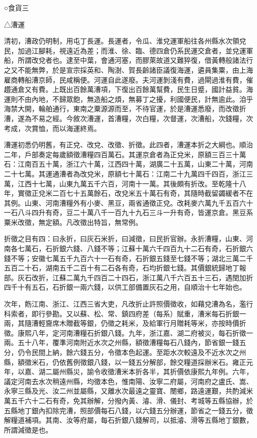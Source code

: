 
\begin{pinyinscope}
○食貨三

△漕運

清初，漕政仍明制，用屯丁長運。長運者，令瓜、淮兌運軍船往各州縣水次領兌民，加過江腳耗，視遠近為差；而淮、徐、臨、德四倉仍系民運交倉者，並兌運軍船，所謂改兌者也。逮至中葉，會通河塞，而膠萊故道又難猝復，借黃轉般諸法行之又不能無弊，於是宣宗採英和、陶澍、賀長齡諸臣議復海運，遴員集粟，由上海雇商轉船漕京師，民咸稱便。河運自此遂廢。夫河運剝淺有費，過閘過淮有費，催趲通倉又有費。上既出百餘萬漕項，下復出百餘萬幫費，民生日蹙，國計益貧。海運則不由內地，不歸眾飽，無造船之煩，無募丁之擾，利國便民，計無逾此。洎乎海禁大開，輪舶通行，東南之粟源源而至，不待官運，於是漕運悉廢，而改徵折漕，遂為不易之經。今敘次漕運，首漕糧，次白糧，次督運，次漕船，次錢糧，次考成，次賞恤，而以海運終焉。

漕運初悉仍明舊，有正兌、改兌、改徵、折徵。此四者，漕運本折之大綱也。順治二年，戶部奏定每歲額徵漕糧四百萬石。其運京倉者為正兌米，原額三百三十萬石：江南百五十萬，浙江六十萬，江西四十萬，湖廣二十五萬，山東二十萬，河南二十七萬。其運通漕者為改兌米，原額七十萬石：江南二十九萬四千四百，浙江三萬，江西十七萬，山東九萬五千六百，河南十一萬。其後頗有折改。至乾隆十八年，實徵正兌米二百七十五萬餘石，改兌米五十萬石有奇，其隨時截留蠲緩者不在其例。山東、河南漕糧外有小麥、黑豆，兩省通徵正兌。改耗麥六萬九千五百六十一石八斗四升有奇，豆二十萬八千一百九十九石三斗一升有奇，皆運京倉。黑豆系粟米改徵，無定額。凡改徵出特旨，無常例。

折徵之目有四：曰永折，曰灰石米折，曰減徵，曰民折官辦。永折漕糧，山東、河南各七萬石，石折銀六錢、八錢不等；江蘇十萬六千四百九十二石有奇，石折銀六錢不等；安徽七萬五千九百六十一石有奇，石折銀五錢至七錢不等；湖北三萬二千五百二十石，湖南五千二百十有二石各有奇，石均折銀七錢。其價銀統歸地丁報部。灰石改折，江蘇二萬九千四百二十四石，浙江萬八千六百五十三石，遇閏加折四千十有五石，石折銀一兩六錢，以供工部備置灰石之用，自順治十七年始也。

次年，飭江南、浙江、江西三省大吏，凡改折止許照價徵收，如藉兌漕為名，濫行科索者，即行參勘。又以蘇、松、常、鎮四府差（每系）賦重，漕米每石折銀一兩，其隨漕輕齎席木贈截等銀，仍徵之耗米，及給軍行月贈耗等米，亦按時價折徵。康熙八年，定河南漕糧石折銀八錢。九年，浙江嘉、湖二府被災，每石折徵一兩。五十八年，覆準河南附近水次之州縣，額徵漕糧每石八錢內，節省銀一錢五分，仍令民間上納，餘六錢五分，令徵本色起運。至距水次較遠及不近水次之州縣，額徵米石，仍依舊例徵銀八錢，以一錢五分解部，餘交糧道採辦米石。雍正元年，以嘉、湖二屬州縣災，諭令收徵漕米本折各半，其折價依康熙九年例。六年，議定河南去水次稍遠州縣，均徵本色，惟南陽、汝寧二府屬，河南府之盧氏、嵩、永寧三縣及光、汝二州並屬縣，又離水次最遠之靈寶、閿鄉，路遠運艱，共酌減米萬五千六十二石有奇，免其辦解，分撥內黃、濬、滑、儀封、考城等五縣協辦，於五縣地丁銀內扣除完漕，照部價每石八錢，以六錢五分辦運，節省之一錢五分，徵解糧道補項。其南、汝等府屬，每石折銀八錢解司，以抵濬、滑等五縣地丁銀數，所謂減徵是也。


\end{pinyinscope}
